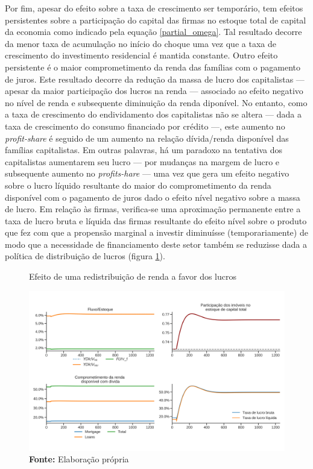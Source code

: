 Por fim, apesar do efeito sobre a taxa de crescimento ser temporário, tem efeitos persistentes sobre a participação do capital das firmas no estoque total de capital da economia como indicado pela equação \ref{partial_omega}. Tal resultado decorre da menor taxa de acumulação no início do choque uma vez que a taxa de crescimento do investimento residencial é mantida constante. 
Outro efeito persistente é o maior comprometimento da renda das famílias com o pagamento de juros. 
Este resultado decorre da redução da massa de lucro dos capitalistas  --- apesar da maior participação dos lucros na renda --- associado ao efeito negativo no nível de renda e subsequente diminuição da renda diponível.
No entanto, como a taxa de crescimento do endividamento dos capitalistas não se altera --- dada a taxa de crescimento do consumo financiado por crédito ---, este aumento no \textit{profit-share} é seguido de um aumento na relação dívida/renda disponível das famílias capitalistas.
Em outras palavras, há um paradoxo na tentativa dos capitalistas aumentarem seu lucro --- por mudanças na margem de lucro e subsequente aumento no \textit{profits-hare} --- uma vez que gera um efeito negativo sobre o lucro líquido resultante do maior do comprometimento da renda disponível com o pagamento de juros dado o efeito nível negativo sobre a massa de lucro.
Em relação às firmas, verifica-se uma aproximação permanente entre a taxa de lucro bruta e líquida das firmas resultante do efeito nível sobre o produto que fez com que a propensão marginal a investir diminuísse (temporariamente) de modo que a necessidade de financiamento deste setor também se reduzisse dada a política de distribuição de lucros (figura \ref{choque_2Norms}).

\begin{figure}[H]
	\centering
	\caption{Efeito de uma redistribuição de renda a favor dos lucros}
	\label{choque_2Norms}
	\includegraphics[width=\textwidth]{../../Modelo/Versoes/Shock_2Norms.png}
	\caption*{\textbf{Fonte:} Elaboração própria}
\end{figure}


